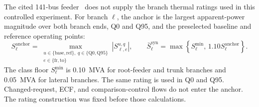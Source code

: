 \documentclass[11pt]{article}
\begin{document}
The cited 141-bus feeder~\cite{khodr2008capacitors} does not supply the branch
thermal ratings used in this controlled experiment. For branch $\ell$, the
anchor is the largest apparent-power magnitude over both branch ends, Q0 and
Q95, and the preselected baseline and reference operating points:
\begin{equation}
S_{\ell}^{\mathrm{anchor}}=
\max_{\substack{u\in\{\mathrm{base},\mathrm{ref}\},\;
q\in\{\mathrm{Q0},\mathrm{Q95}\}\\
e\in\{\mathrm{fr},\mathrm{to}\}}}
\left|S_{\ell,e}^{u,q}\right|,
\qquad
\bar S_{\ell}^{\mathrm{syn}}=
\max\!\left\{S_{\ell}^{\min},\,1.10S_{\ell}^{\mathrm{anchor}}\right\}.
\label{eq:supp_synthetic_rating}
\end{equation}
The class floor $S_{\ell}^{\min}$ is 0.10~MVA for root-feeder and trunk
branches and 0.05~MVA for lateral branches. The same rating is used in Q0 and
Q95. Changed-request, ECF, and comparison-control flows do not enter the anchor.
The rating construction was fixed before those calculations.
\end{document}

